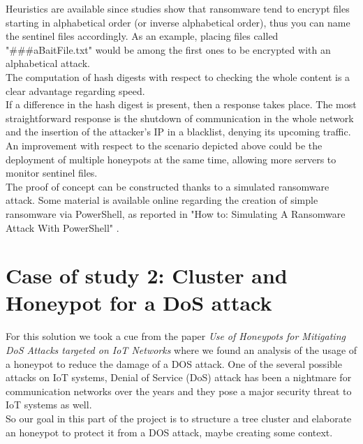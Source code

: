 Heuristics are available since studies show that ransomware tend to encrypt files starting in alphabetical order (or inverse alphabetical order), thus you can name the sentinel files accordingly. As an example, placing files called "\#\#\#aBaitFile.txt" would be among the first ones to be encrypted with an alphabetical attack.\\
The computation of hash digests with respect to checking the whole content is a clear advantage regarding speed.\\
If a difference in the hash digest is present, then a response takes place. The most straightforward response is the shutdown of communication in the whole network and the insertion of the attacker's IP in a blacklist, denying its upcoming traffic.\\
An improvement with respect to the scenario depicted above could be the deployment of multiple honeypots at the same time, allowing more servers to monitor sentinel files.\\
The proof of concept can be constructed thanks to a simulated ransomware attack. Some material is available online regarding the creation of simple ransomware via PowerShell, as reported in "How to: Simulating A Ransomware Attack With PowerShell" \cite{Howto}.



\section{Case of study 2: Cluster and Honeypot for a DoS attack}

For this solution we took a cue from the paper \textit{Use of Honeypots for Mitigating DoS Attacks 
targeted on IoT Networks}\cite{7944057} where we found an analysis of the usage of a honeypot to reduce the damage of a DOS attack. One of the several possible attacks on IoT 
systems, Denial of Service (DoS) attack has been a nightmare for 
communication networks over the years and they 
pose a major security threat to IoT systems as well.\\
So our goal in this part of the project is to structure a tree cluster and elaborate an honeypot to protect it from a DOS attack, maybe creating some context.
  
